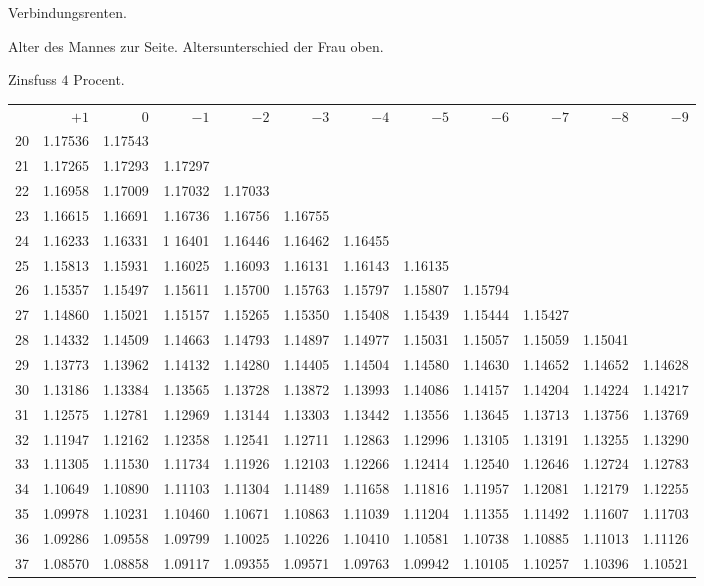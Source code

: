 \clearpage
{}
\begin{center}
Verbindungsrenten.\par\smallskip
Alter des Mannes zur Seite. Altersunterschied der Frau oben.\par\smallskip
Zinsfuss \(4\) Procent.\par\medskip
\fontsize{8}{10}\selectfont\setlength{\tabcolsep}{1.3pt}
\begin{tabular}{|r|rrrrrrrrrrr|}
\hline
&\(+1\)&0&\(-1\)&\(-2\)&\(-3\)&\(-4\)&\(-5\)&\(-6\)&\(-7\)&\(-8\)&\(-9\)\\[8pt]
20&1.17536&1.17543&&&&&&&&&\\
21&1.17265&1.17293&1.17297&&&&&&&&\\
22&1.16958&1.17009&1.17032&1.17033&&&&&&&\\
23&1.16615&1.16691&1.16736&1.16756&1.16755&&&&&&\\
24&1.16233&1.16331&1 16401&1.16446&1.16462&1.16455&&&&&\\[5pt]
25&1.15813&1.15931&1.16025&1.16093&1.16131&1.16143&1.16135&&&&\\
26&1.15357&1.15497&1.15611&1.15700&1.15763&1.15797&1.15807&1.15794&&&\\
27&1.14860&1.15021&1.15157&1.15265&1.15350&1.15408&1.15439&1.15444&1.15427&&\\
28&1.14332&1.14509&1.14663&1.14793&1.14897&1.14977&1.15031&1.15057&1.15059&1.15041&\\
29&1.13773&1.13962&1.14132&1.14280&1.14405&1.14504&1.14580&1.14630&1.14652&1.14652&1.14628\\[5pt]
30&1.13186&1.13384&1.13565&1.13728&1.13872&1.13993&1.14086&1.14157&1.14204&1.14224&1.14217\\
31&1.12575&1.12781&1.12969&1.13144&1.13303&1.13442&1.13556&1.13645&1.13713&1.13756&1.13769\\
32&1.11947&1.12162&1.12358&1.12541&1.12711&1.12863&1.12996&1.13105&1.13191&1.13255&1.13290\\
33&1.11305&1.11530&1.11734&1.11926&1.12103&1.12266&1.12414&1.12540&1.12646&1.12724&1.12783\\
34&1.10649&1.10890&1.11103&1.11304&1.11489&1.11658&1.11816&1.11957&1.12081&1.12179&1.12255\\[5pt]
35&1.09978&1.10231&1.10460&1.10671&1.10863&1.11039&1.11204&1.11355&1.11492&1.11607&1.11703\\
36&1.09286&1.09558&1.09799&1.10025&1.10226&1.10410&1.10581&1.10738&1.10885&1.11013&1.11126\\
37&1.08570&1.08858&1.09117&1.09355&1.09571&1.09763&1.09942&1.10105&1.10257&1.10396&1.10521\\

\end{tabular}
\end{center}
